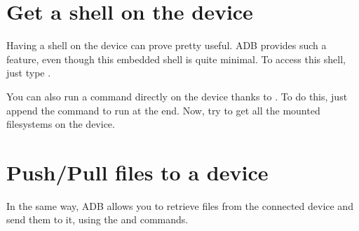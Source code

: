 \section{Get a shell on the device}

Having a shell on the device can prove pretty useful. ADB provides
such a feature, even though this embedded shell is quite minimal. To
access this shell, just type .

You can also run a command directly on the device thanks to
. To do this, just append the command to run at the
end. Now, try to get all the mounted filesystems on the device.

\section{Push/Pull files to a device}

In the same way, ADB allows you to retrieve files from the connected
device and send them to it, using the  and 
commands.

